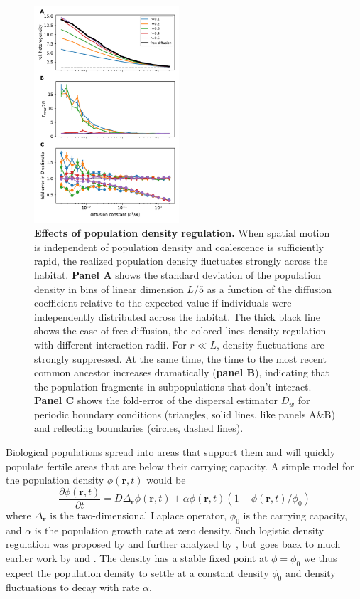 \documentclass[aps,rmp, twocolumn]{revtex4}
\newcommand{\rvec}{\mathbf{r}}
\begin{document}
\begin{figure}
    \includegraphics[width=0.48\textwidth]{figures/stable_density}
    \caption{\label{fig:density_reg}  {\bf Effects of population density regulation.}
    When spatial motion is independent of population density and coalescence is sufficiently rapid, the realized population density fluctuates strongly across the habitat.
    {\bf Panel A} shows the standard deviation of the population density in bins of linear dimension $L/5$ as a function of the diffusion coefficient relative to the expected value if individuals were independently distributed across the habitat. The thick black line shows the case of free diffusion, the colored lines density regulation with different interaction radii. For $r\ll L$, density fluctuations are strongly suppressed.
    At the same time, the time to the most recent common ancestor increases dramatically ({\bf panel B}), indicating that the population fragments in subpopulations that don't interact.
    {\bf Panel C} shows the fold-error of the dispersal estimator $D_w$ for periodic boundary conditions (triangles, solid lines, like panels A\&B) and reflecting boundaries (circles, dashed lines).
    }
\end{figure}

Biological populations spread into areas that support them and will quickly populate fertile areas that are below their carrying capacity.
A simple model for the population density $\phi(\rvec,t)$ would be
\begin{equation}
    \label{eq:FKPP}
    \frac{\partial \phi(\rvec,t)}{\partial t} = D \Delta_{\rvec} \phi(\rvec,t) + \alpha \phi(\rvec,t)(1-\phi(\rvec,t)/\phi_0)
\end{equation}
where $ \Delta_{\rvec}$ is the two-dimensional Laplace operator, $\phi_0$ is the carrying capacity, and $\alpha$ is the population growth rate at zero density.
Such logistic density regulation was proposed by \citet{bolker_using_1997} and further analyzed by \citet{etheridge_survival_2004}, but goes back to much earlier work by \citet{fisher_wave_1937} and \citet{KPP1937}.
The density has a stable fixed point at $\phi=\phi_0$ we thus expect the population density to settle at a constant density $\phi_0$ and density fluctuations to decay with rate $\alpha$.
\end{document}
